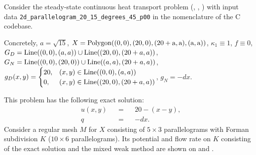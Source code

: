 \begin{example}
  \label{cmc/diffusion/continuous/steady_state/examples/2d_parallelogram_20_15_degrees_45_p00-example}
  Consider the steady-state continuous heat transport problem
  (,
   ,
   )
  with input data \verb|2d_parallelogram_20_15_degrees_45_p00| in the nomenclature of the C codebase.

  Concretely,
    $a = \sqrt{15}$,
    $X = {\rm Polygon((0, 0), (20, 0), (20 + a, a), (a, a))}$,
    $\kappa_1 \equiv 1$,
    $f \equiv 0$,
    $G_D = {\rm Line}((0, 0), (a, a)) \cup {\rm Line}((20, 0), (20 + a, a))$,
    $G_N = {\rm Line}((0, 0), (20, 0)) \cup {\rm Line}((a, a), (20 + a, a))$,
    $g_D(x, y) =
      \begin{cases}
        20, & (x, y) \in {\rm Line}((0, 0), (a, a)) \\
        0,  & (x, y) \in {\rm Line}((20, 0), (20 + a, a))
      \end{cases}
    $,
    $g_N = - d x$.

  This problem has the following exact solution:
  \begin{subequations}
    \begin{alignat}{3}
      & u(x, y) && = && 20 - (x - y), \\
      & q && = && - d x.
    \end{alignat}
  \end{subequations}
  Consider a regular mesh $M$ for $X$ consisting of $5 \times 3$ parallelograms
  with Forman subdivision $K$ ($10 \times 6$ parallelograms).
  Its potential and flow rate on $K$ consisting of the exact solution and the
  mixed weak method are shown on
  and
  .
\end{example}
